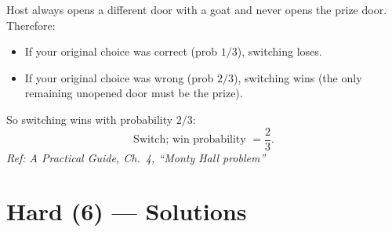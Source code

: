 \documentclass[11pt]{article}
\begin{document}
\begin{enumerate}[label=\textbf{\arabic*.}, resume]
Host always opens a different door with a goat and never opens the prize door. Therefore:
\begin{itemize}
\item If your original choice was correct (prob $1/3$), switching loses.
\item If your original choice was wrong (prob $2/3$), switching wins (the only remaining unopened door must be the prize).
\end{itemize}

So switching wins with probability $2/3$:
\[
\boxed{\text{Switch; win probability }=\frac{2}{3}.}
\]
\hfill{\small\textit{Ref: A Practical Guide, Ch.\ 4, ``Monty Hall problem''}}

\end{enumerate}

\section*{Hard (6) — Solutions}
\end{document}
